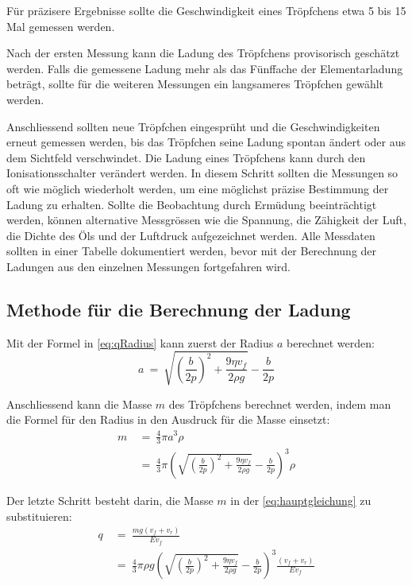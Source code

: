 Für präzisere Ergebnisse sollte die Geschwindigkeit eines Tröpfchens etwa 5 bis 15 Mal gemessen werden.

Nach der ersten Messung kann die Ladung des Tröpfchens provisorisch geschätzt werden. Falls die gemessene Ladung mehr als das Fünffache der Elementarladung beträgt, sollte für die weiteren Messungen ein langsameres Tröpfchen gewählt werden.

Anschliessend sollten neue Tröpfchen eingesprüht und die Geschwindigkeiten erneut gemessen werden, bis das Tröpfchen seine Ladung spontan ändert oder aus dem Sichtfeld verschwindet. Die Ladung eines Tröpfchens kann durch den Ionisationsschalter verändert werden. In diesem Schritt sollten die Messungen so oft wie möglich wiederholt werden, um eine möglichst präzise Bestimmung der Ladung zu erhalten. Sollte die Beobachtung durch Ermüdung beeinträchtigt werden, können alternative Messgrössen wie die Spannung, die Zähigkeit der Luft, die Dichte des Öls und der Luftdruck aufgezeichnet werden. Alle Messdaten sollten in einer Tabelle dokumentiert werden, bevor mit der Berechnung der Ladungen aus den einzelnen Messungen fortgefahren wird.

\subsection{Methode für die Berechnung der Ladung}\label{sub:methodeBerechnung}
Mit der Formel in \autoref{eq:qRadius} kann zuerst der Radius $a$ berechnet werden:
\begin{equation*}
	a \ = \ \sqrt{\left( \frac{b}{2p}\right)^2 + \frac{9\eta v_f}{2\rho g}} - \frac{b}{2p}
\end{equation*}

\noindent Anschliessend kann die Masse $m$ des Tröpfchens berechnet werden, indem man die Formel für den Radius in den Ausdruck für die Masse einsetzt:
\begin{equation*}
	\begin{split}
		m & \ = \ \frac{4}{3}\pi a^3 \rho \\
		& \ = \ \frac{4}{3}\pi \left( \sqrt{\left( \frac{b}{2p}\right)^2 + \frac{9\eta v_f}{2\rho g}} - \frac{b}{2p} \right)^3 \rho
	\end{split}
\end{equation*}

\noindent Der letzte Schritt besteht darin, die Masse $m$ in der \autoref{eq:hauptgleichung} zu substituieren:
\begin{equation*}
	\begin{split}
		q & \ = \ \frac{m g (v_f + v_r)}{Ev_f} \\
		& \ = \ \frac{4}{3} \pi \rho g \left( \sqrt{\left( \frac{b}{2p}\right)^2 + \frac{9\eta v_f}{2\rho g}} - \frac{b}{2p} \right)^3 \frac{(v_f + v_r)}{Ev_f}
	\end{split}
\end{equation*}

